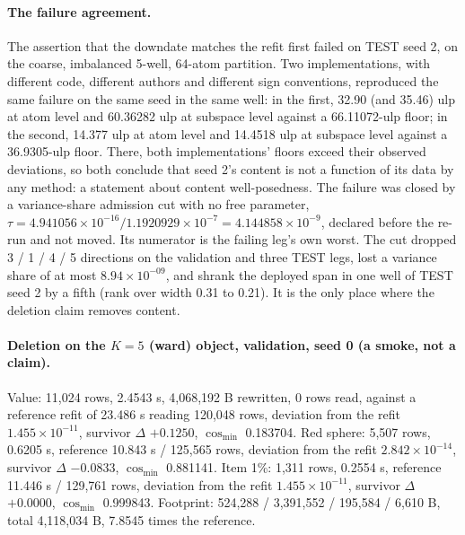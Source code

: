 \documentclass{article} %
\newcommand{\sci}[2]{\ensuremath{#1\times10^{#2}}}
\begin{document}
\paragraph{The failure agreement.} The assertion that the downdate matches the refit first failed on TEST seed 2, on the
coarse, imbalanced 5-well, 64-atom partition. Two implementations, with different code, different
authors and different sign conventions, reproduced the same failure on the same seed in the same
well: in the first, 32.90 (and 35.46) ulp at atom level and 60.36282 ulp at subspace level against
a 66.11072-ulp floor; in the second, 14.377 ulp at atom level and 14.4518 ulp at subspace level
against a 36.9305-ulp floor. There, both implementations' floors exceed their observed deviations,
so both conclude that seed 2's content is not a function of its data by any method: a statement
about content well-posedness. The failure was closed by a variance-share admission cut with no
free parameter, $\tau=4.941056\times10^{-16}/1.1920929\times10^{-7}=4.144858\times10^{-9}$,
declared before the re-run and not moved. Its numerator is the failing leg's own worst.
The cut dropped 3 / 1 / 4 / 5 directions on the validation and three TEST legs, lost a variance
share of at most \sci{8.94}{-09}, and shrank the deployed span in one well of TEST seed 2 by a
fifth (rank over width 0.31 to 0.21). It is the only place where the deletion claim removes content.

\paragraph{Deletion on the $K=5$ (ward) object, validation, seed 0 (a smoke, not a claim).} Value:
11,024 rows, 2.4543 s, 4,068,192 B rewritten, 0 rows read, against a reference refit of 23.486 s
reading 120,048 rows, deviation from the refit \sci{1.455}{-11}, survivor $\Delta$ $+0.1250$, $\cos_{\min}$
0.183704. Red sphere: 5,507 rows, 0.6205 s, reference 10.843 s / 125,565 rows, deviation from the refit \sci{2.842}{-14}, survivor $\Delta$ $-0.0833$, $\cos_{\min}$ 0.881141. Item 1\%: 1,311 rows,
0.2554 s, reference 11.446 s / 129,761 rows, deviation from the refit \sci{1.455}{-11}, survivor $\Delta$
$+0.0000$, $\cos_{\min}$ 0.999843. Footprint: 524,288 / 3,391,552 / 195,584 / 6,610 B, total
4,118,034 B, 7.8545 times the reference. %

\end{document}
